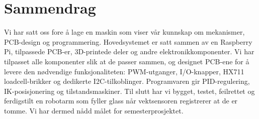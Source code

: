 \section{Sammendrag}
Vi har satt oss fore å lage en maskin som viser vår kunnskap om mekanismer, PCB-design og programmering. Hovedsystemet er satt sammen av en Raspberry Pi, tilpassede PCB-er, 3D-printede deler og andre elektronikkomponenter. Vi har tilpasset alle komponenter slik at de passer sammen, og designet PCB-ene for å levere den nødvendige funksjonaliteten: PWM-utganger, I/O-knapper, HX711 loadcell-brikker og dedikerte I2C-tilkoblinger. Programvaren gir PID-regulering, IK-posisjonering og tilstandsmaskiner. Til slutt har vi bygget, testet, feilrettet og ferdigstilt en robotarm som fyller glass når vektsensoren registrerer at de er tomme. Vi har dermed nådd målet for semesterprosjektet.